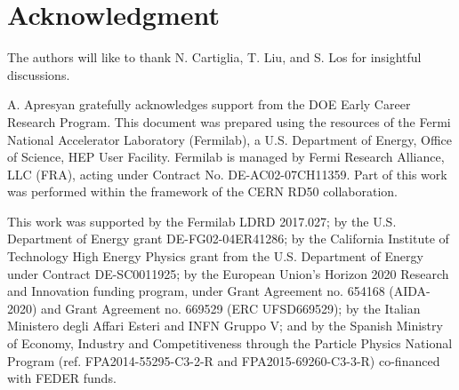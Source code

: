 \documentclass[preprint,1p]{elsarticle}
\begin{document}
\section*{Acknowledgment}

The authors will like to thank N. Cartiglia, T. Liu, and S. Los for insightful discussions.

A. Apresyan gratefully acknowledges support from the DOE Early Career Research Program.
This document was prepared using the resources of the Fermi National Accelerator
Laboratory (Fermilab), a U.S. Department of Energy, Office of Science, HEP User
Facility. Fermilab is managed by Fermi Research Alliance, LLC (FRA), acting
under Contract No. DE-AC02-07CH11359. Part of this work was performed within the
framework of the CERN RD50 collaboration.

This work was supported by the Fermilab LDRD 2017.027; by the U.S.
Department of Energy grant DE-FG02-04ER41286; by the California Institute of
Technology High Energy Physics grant from the U.S.
Department of Energy under Contract DE-SC0011925; by the European
Union's Horizon 2020 Research and Innovation funding program, under Grant
Agreement no. 654168 (AIDA-2020) and Grant Agreement no. 669529 (ERC
UFSD669529); by the Italian Ministero degli Affari Esteri and INFN Gruppo V; and
by the Spanish Ministry of Economy, Industry and Competitiveness through the
Particle Physics National Program (ref. FPA2014-55295-C3-2-R and
FPA2015-69260-C3-3-R) co-financed with FEDER funds.








{}





\end{document}
